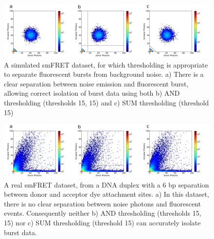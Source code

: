 \begin{figure}
   \begin{center}
      \includegraphics*[clip=true, width=6in]{inference/thresholding_idealised.pdf}
      \caption{A simulated smFRET dataset, for which thresholding is appropriate to separate fluorescent bursts from background noise. a) There is a clear separation between noise emission and fluorescent burst, allowing correct isolation of burst data using both b) AND thresholding (thresholds 15, 15) and c) SUM thresholding (threshold 15)}
      \label{fig:simulationscatter}
   \end{center}
\end{figure}

\begin{figure}
   \begin{center}
      \includegraphics*[clip=true, width=6in]{inference/thresholding_real.pdf}
      \caption{A real smFRET dataset, from a DNA duplex with a 6 bp separation between donor and acceptor dye attachment sites. a) In this dataset, there is no clear separation between noise photons and fluorescent events. Consequently neither b) AND thresholding (thresholds 15, 15) nor c) SUM thresholding (threshold 15) can accurately isolate burst data.}
      \label{fig:scatterDA}
   \end{center}
\end{figure}


